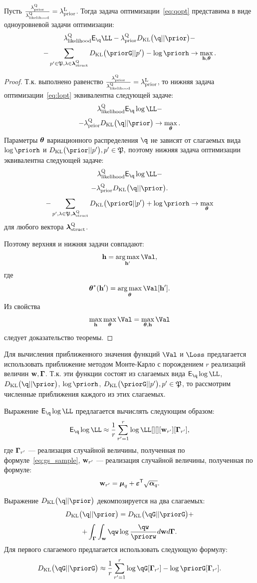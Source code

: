 \begin{theorem}
Пусть $\frac{\lambda_\text{prior}^\text{Q}}{\lambda_\text{likelihood}^\text{Q}} = \lambda_\text{prior}^\text{L}$. 
Тогда задача оптимизации~\eqref{eq:qopt} представима в виде одноуровневой задачи оптимизации:
\[
\lamLL \E_{\q}\LL - \lamCQ \KL{\q}{\prior} -
\]
\[
-\sum_{p' \in \mathfrak{P}, \lambda \in \lamS} \KL{\priorG}{p'} - \log \priorh \to \max_{\h, \teta}. 
\]
\end{theorem}
\begin{proof}
Т.к. выполнено равенство  $\frac{\lambda_\text{prior}^\text{Q}}{\lambda_\text{likelihood}^\text{Q}} = \lambda_\text{prior}^\text{L}$, то нижняя задача оптимизации~\eqref{eq:lopt} эквивалентна следующей задаче:
\[
\lamLL \E_{\q} \log \LL -  
\]
\[
    -\lamCQ \KL{\q}{\prior} \to \max_{\teta}.
\]
Параметры $\boldsymbol{\theta}$ вариационного распределения $\q$ не зависят от слагаемых вида $\log \priorh$ и $\KL{\prior}{p'}, p' \in \mathfrak{P},$ поэтому нижняя задача оптимизации
эквивалентна следующей задаче:
\[
\lamLL \E_{\q} \log \LL -  
\]
\[
    -\lamCQ \KL{\q}{\prior}. 
\]
\[
-\sum_{p', \lambda \in \mathfrak{P}, \lamS} \KL{\priorG}{p'} + \log \priorh \to \max_{\teta}
\]
для любого вектора $\boldsymbol{\lambda}_\text{struct}^\text{Q}$. 


Поэтому верхняя и нижняя задачи совпадают:
\[
    \h = \argmax_{\h'} \Val,
\]
где 
\[
    \teta^{*}(\h') = \argmax_{\teta} \Val[\h'].
\]
Из свойства 
\[
    \max_{\h}\max_{\teta} \Val = \max_{\teta, \h} \Val
\]
следует доказательство теоремы.
\end{proof}


Для вычисления приближенного значения функций $\Val$ и $\Loss$ предлагается использовать приближение методом Монте-Карло с порождением $r$ реализаций величин $\mathbf{w},\boldsymbol{\Gamma}$.
Т.к. эти функции состоят из слагаемых вида $\E_{\q}\log \LL$, $\KL{\q}{\prior}$, $\log \priorh$, $\KL{\priorG}{p'}, p' \in \mathfrak{P}$, то рассмотрим численные приближения каждого из этих слагаемых.

Выражение $\E_{\q}\log \LL$ предлагается вычислять следующим образом:
\[
    \E_{\q}\log \LL \approx \frac{1}{r}\sum_{r'=1}^r \log \LL[][][\w_{r'}][\G_{r'}],
\]
где $\boldsymbol{\Gamma}_{r'}$ --- реализация случайной величины, полученная по формуле~\eqref{eq:gs_sample}, $\mathbf{w}_{r'}$ --- реализация случайной величины, полученная по формуле:
\[
\mathbf{w}_{r'} = \boldsymbol{\mu}_q + \boldsymbol{\varepsilon}^\mathsf{T} \sqrt{\boldsymbol{\alpha}_q}.
\]

Выражение $\KL{\q}{\prior}$ декомпозируется на два слагаемых:
\[
    \KL{\q}{\prior} = \KL{\qG}{\priorG} +
\]
\[
+ \int_{\G}\int_{\w}\qw\log\frac{\qw}{\priorw}d\w d\G.
\]
Для первого слагаемого предлагается использовать следующую формулу:
\begin{equation}
\label{eq:klg_approx}
    \KL{\qG}{\priorG} \approx \frac{1}{r}\sum_{r'=1}^r\log \qG[\G_{r'}] - \log \priorG[\G_{r'}]. 
\end{equation}

